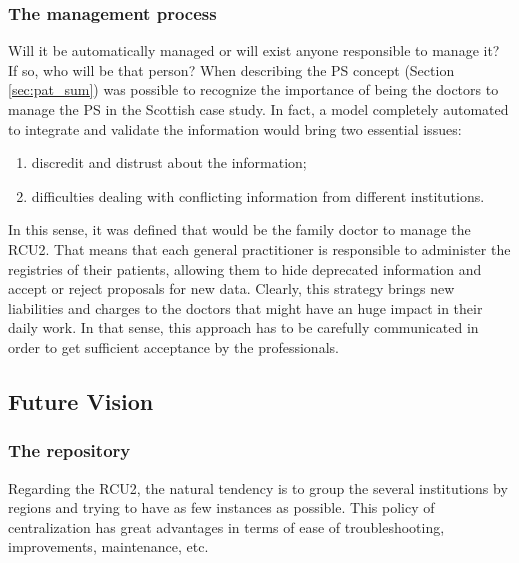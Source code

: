 \subsubsection{The management process}

Will it be automatically managed or will exist anyone responsible to manage it? If so, who will be that person? When describing the PS concept (Section \ref{sec:pat_sum}) was possible to recognize the importance of being the doctors to manage the PS in the Scottish case study. In fact, a model completely automated to integrate and validate the information would bring two essential issues:
\begin{enumerate}
\item discredit and distrust about the information;
\item difficulties dealing with conflicting information from different institutions.
\end{enumerate}

In this sense, it was defined that would be the family doctor to manage the RCU2. That means that each general practitioner is responsible to administer the registries of their patients, allowing them to hide deprecated information and accept or reject proposals for new data. Clearly, this strategy brings new liabilities and charges to the doctors that might have an huge impact in their daily work. In that sense, this approach has to be carefully communicated in order to get sufficient acceptance by the professionals.









\subsection{Future Vision}

\subsubsection{The repository}

Regarding the RCU2, the natural tendency is to group the several institutions by regions and trying to have as few instances as possible. This policy of centralization has great advantages in terms of ease of troubleshooting, improvements, maintenance, etc. 


